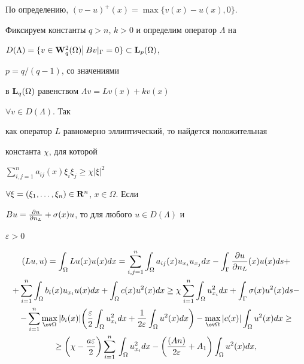  


По определению, $(v-u)^+(x)=\max\{v(x)-u(x),0\}$. 


 


Фиксируем константы $q>n$, $k>0$ и определим оператор $\Lambda$ на 


$D(\Lambda)=\{v\in\bold W^2_q(\Omega)\big|\,Bv|_\Gamma=0\} 


\subset\bold L_p(\Omega)$, 


$p=q/(q-1)$, со значениями 


в $\bold L_q(\Omega)$ равенством $\Lambda v=Lv(x)+kv(x)$\; 


$\forall v\in D(\Lambda)$. Так 


как оператор $L$ равномерно эллиптический, то найдется положительная 


константа $\chi$, для которой 


$\sum\limits^n_{i,j=1}a_{ij}(x)\xi_i\xi_j\ge\chi|\xi|^2$\; 


$\forall\xi=(\xi_1,\dotsc,\xi_n)\in\bold R^n$, $x\in\Omega$. Если 


$Bu=\frac{\partial u}{\partial n_L}+\sigma(x)u$, то для любого $u\in D(\Lambda)$ и 


$\varepsilon>0$ 


\begin{multline*} 


(Lu,u)=\int_\Omega Lu(x)u(x)dx=\sum^n_{i,j=1}\int_\Omega 


a_{ij}(x)u_{x_i}u_{x_j}dx-\int_\Gamma\myfrac{u}{n_L}(x)u(x)ds+ \\ 


% 


+\sum^n_{i=1}\int_\Omega b_i(x)u_{x_i}u(x)dx+\int_\Omega 


c(x)u^2(x)dx\ge \chi\sum^n_{i=1}\int_\Omega u^2_{x_i}dx+ 


\int_\Gamma \sigma(x)u^2(x)ds - \\ 


% 


-\sum^n_{i=1}\max_{\ov\Omega}|b_i(x)|\bigg(\frac{\varepsilon}{2} 


\int_\Omega u^2_{x_i}dx+\frac{1}{2\varepsilon} 


\int_\Omega u^2(x)dx\bigg)-\max_{\ov\Omega}|c(x)| 


\int_\Omega u^2(x)dx \ge \\


% 


\ge\bigg(\chi-\frac{a\varepsilon}{2}\bigg)\sum^n_{i=1}\, 


\int_\Omega u^2_{x_i}dx-\bigg(\frac{(An)}{2\varepsilon}+A_1\bigg) 


\int_\Omega u^2(x)dx, 


\end{multline*} 


